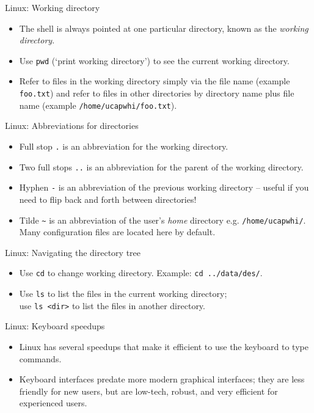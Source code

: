\documentclass{beamer}
\newcommand{\command}[1]{\colorbox{light-gray}{\texttt{#1}}}
\newcommand{\filename}[1]{\colorbox{light-green}{\texttt{#1}}}
\begin{document}
\begin{frame}{Linux: Working directory}
  \begin{itemize}
    \item The shell is always pointed at one particular directory, known as the \textit{working directory}.
    \item Use \command{pwd} (`print working directory') to see the current working directory.
    \item Refer to files in the working directory simply via the file name (example \filename{foo.txt}) and refer to files in other directories by directory name plus file name (example \filename{/home/ucapwhi/foo.txt}).
  \end{itemize}
\end{frame}


\begin{frame}{Linux: Abbreviations for directories}
  \begin{itemize}
    \item Full stop \filename{.} is an abbreviation for the working directory.
    \item Two full stops \filename{..} is an abbreviation for the parent of the working directory.
    \item Hyphen \filename{-} is an abbreviation of the previous working directory -- useful if you need to flip back and forth between directories!
    \item Tilde \filename{\textasciitilde} is an abbreviation of the user's \textit{home} directory e.g. \filename{/home/ucapwhi/}. Many configuration files are located here by default.
  \end{itemize}
\end{frame}


\begin{frame}{Linux: Navigating the directory tree}
  \begin{itemize}
    \item Use \command{cd} to change working directory. Example: \command{cd ../data/des/}.
    \item Use \command{ls} to list the files in the current working directory; \\use \command{ls <dir>} to list the files in another directory.
  \end{itemize}
\end{frame}


\begin{frame}{Linux: Keyboard speedups}
  \begin{itemize}
    \item Linux has several speedups that make it efficient to use the keyboard to type commands.
    \item Keyboard interfaces predate more modern graphical interfaces; they are less friendly for new users, but are low-tech, robust, and very efficient for experienced users.
  \end{itemize}
\end{frame}
\end{document}

